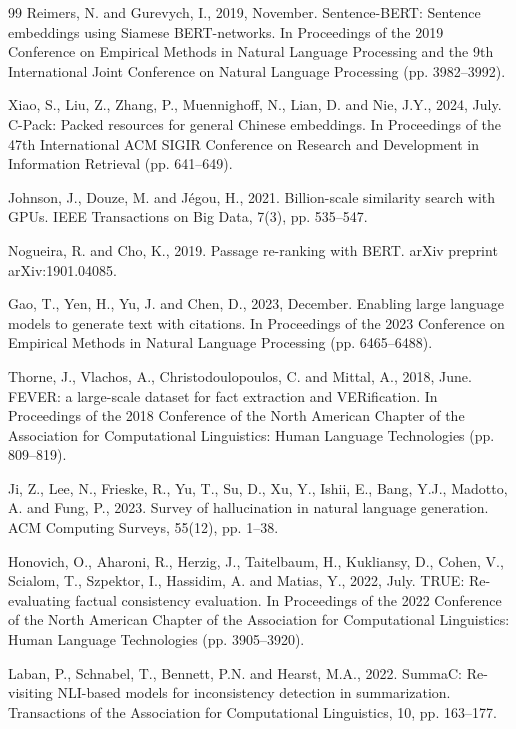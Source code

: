 \documentclass[conference]{IEEEtran}
\begin{document}
\begin{thebibliography}{99}
Reimers, N. and Gurevych, I., 2019, November. Sentence-BERT: Sentence embeddings using Siamese BERT-networks. In
Proceedings of the 2019 Conference on Empirical Methods in Natural Language Processing and the 9th International Joint
Conference on Natural Language Processing (pp. 3982--3992).

Xiao, S., Liu, Z., Zhang, P., Muennighoff, N., Lian, D. and Nie, J.Y., 2024, July. C-Pack: Packed resources for general
Chinese embeddings. In Proceedings of the 47th International ACM SIGIR Conference on Research and Development in
Information Retrieval (pp. 641--649).

Johnson, J., Douze, M. and J\'egou, H., 2021. Billion-scale similarity search with GPUs. IEEE Transactions on Big Data,
7(3), pp. 535--547.

Nogueira, R. and Cho, K., 2019. Passage re-ranking with BERT. arXiv preprint arXiv:1901.04085.

Gao, T., Yen, H., Yu, J. and Chen, D., 2023, December. Enabling large language models to generate text with citations. In
Proceedings of the 2023 Conference on Empirical Methods in Natural Language Processing (pp. 6465--6488).

Thorne, J., Vlachos, A., Christodoulopoulos, C. and Mittal, A., 2018, June. FEVER: a large-scale dataset for fact
extraction and VERification. In Proceedings of the 2018 Conference of the North American Chapter of the Association for
Computational Linguistics: Human Language Technologies (pp. 809--819).

Ji, Z., Lee, N., Frieske, R., Yu, T., Su, D., Xu, Y., Ishii, E., Bang, Y.J., Madotto, A. and Fung, P., 2023. Survey of
hallucination in natural language generation. ACM Computing Surveys, 55(12), pp. 1--38.

Honovich, O., Aharoni, R., Herzig, J., Taitelbaum, H., Kukliansy, D., Cohen, V., Scialom, T., Szpektor, I., Hassidim, A.
and Matias, Y., 2022, July. TRUE: Re-evaluating factual consistency evaluation. In Proceedings of the 2022 Conference of
the North American Chapter of the Association for Computational Linguistics: Human Language Technologies (pp. 3905--3920).

Laban, P., Schnabel, T., Bennett, P.N. and Hearst, M.A., 2022. SummaC: Re-visiting NLI-based models for inconsistency
detection in summarization. Transactions of the Association for Computational Linguistics, 10, pp. 163--177.


\end{thebibliography}
\end{document}
